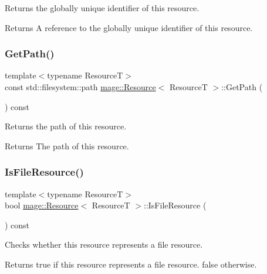 Returns the globally unique identifier of this resource.

\begin{DoxyReturn}{Returns}
A reference to the globally unique identifier of this resource. 
\end{DoxyReturn}
\mbox{\label{classmage_1_1_resource_a7611d0317a247d324d432b26aab6aee2}} 
\subsubsection{\texorpdfstring{Get\+Path()}{GetPath()}}
{\footnotesize\ttfamily template$<$typename ResourceT$>$ \\
const std\+::filesystem\+::path \mbox{\hyperlink{classmage_1_1_resource}{mage\+::\+Resource}}$<$ ResourceT $>$\+::Get\+Path (\begin{DoxyParamCaption}{ }\end{DoxyParamCaption}) const}

Returns the path of this resource.

\begin{DoxyReturn}{Returns}
The path of this resource. 
\end{DoxyReturn}
\mbox{\label{classmage_1_1_resource_ae783140e30a974c8820e5ae8be9e4b44}} 
\subsubsection{\texorpdfstring{Is\+File\+Resource()}{IsFileResource()}}
{\footnotesize\ttfamily template$<$typename ResourceT$>$ \\
bool \mbox{\hyperlink{classmage_1_1_resource}{mage\+::\+Resource}}$<$ ResourceT $>$\+::Is\+File\+Resource (\begin{DoxyParamCaption}{ }\end{DoxyParamCaption}) const}

Checks whether this resource represents a file resource.

\begin{DoxyReturn}{Returns}
{\ttfamily true} if this resource represents a file resource. {\ttfamily false} otherwise. 
\end{DoxyReturn}
\mbox{\label{classmage_1_1_resource_a938159cb02ec565b9b957f993db4769d}} 

